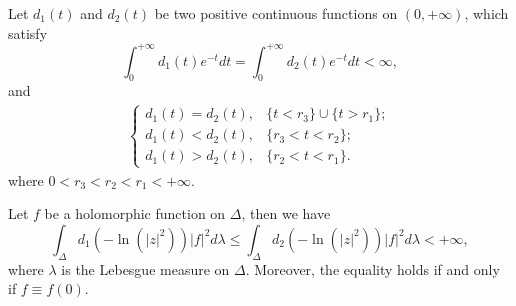 \begin{lemma}
  Let $d_{1}(t)$ and $d_{2}(t)$ be two
  positive continuous functions on $(0,+\infty)$, which satisfy
    $$\int_{0}^{+\infty}d_{1}(t)e^{-t}dt=\int_{0}^{+\infty}d_{2}(t)e^{-t}dt<\infty,$$
    and 
\begin{align*}
  \begin{cases}
    d_1(t)=d_2(t), & \{t<r_{3}\}\cup\{t>r_{1}\};\\
    d_1(t)<d_2(t), & \{r_{3}<t<r_{2}\};\\
    d_1(t)>d_2(t), & \{r_{2}<t<r_{1}\}.
  \end{cases}
\end{align*}
  where $0<r_{3}<r_{2}<r_{1}<+\infty$.

  Let $f$ be a holomorphic function on $\Delta$, then we have
  $$\int_{\Delta}d_{1}(-\ln(|z|^{2}))|f|^{2}d\lambda\leq\int_{\Delta}d_{2}(-\ln(|z|^{2}))|f|^{2}d\lambda<+\infty,$$
  where $\lambda$ is the Lebesgue measure on $\Delta$. Moreover, the
  equality holds if and only if $f\equiv f(0)$.
  \end{lemma}

